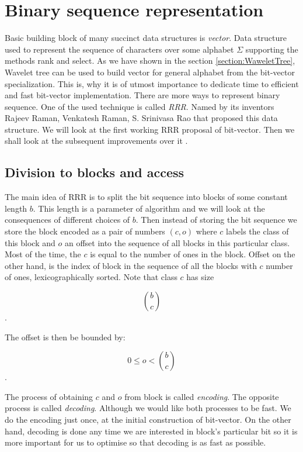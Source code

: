 \chapter{Binary sequence representation}
\label{kap:kap2}

Basic building block of many succinct data structures is \textit{vector}. Data structure
used to represent the sequence of characters over some alphabet $\Sigma$ supporting the
methods rank and select. As we
have shown in the section \ref{section:WaweletTree}, Wavelet tree can be used to
build vector for general alphabet from the bit-vector specialization. This is, why
it is of utmost importance to dedicate time to efficient and fast bit-vector
implementation. There are more ways to represent binary sequence. One of the
used technique is called \textit{RRR}. Named by its inventors Rajeev Raman, Venkatesh Raman,
S. Srinivasa Rao that proposed this data structure\cite{raman2007succinct}. We will look
at the first working RRR proposal of bit-vector\cite{claude2008practical}. Then we
shall look at the subsequent improvements over it \cite{navarro2012fast}.

\section{Division to blocks and access}

The main idea of RRR is to split the bit sequence into blocks of some constant
length $b$. This length is a parameter of algorithm and we will look at the consequences
of different choices of $b$. Then instead of storing the bit sequence we store the
block encoded as a pair of numbers $(c, o)$ where $c$ labels the class of this
block and $o$ an offset into the sequence of all blocks in this particular class.
Most of the time, the $c$ is equal to the number of ones in the block. Offset on
the other hand, is the index of block in the sequence of all the blocks with $c$ number
of ones, lexicographically sorted. Note that class $c$ has size

                $${b\choose c}$$.

The offset is then be bounded by:

				$$0 \leq o < {b\choose c}$$.

The process of obtaining $c$ and $o$ from block is called \textit{encoding}.
The opposite process is called \textit{decoding}. Although we would like both
processes to be fast. We do the encoding just once, at the initial construction
of bit-vector. On the other hand, decoding is done any time we are interested in
block's particular bit so it is more important for us to optimise so that decoding
is as fast as possible.

